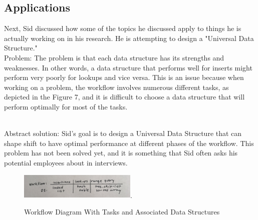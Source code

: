 \subsection{Applications}

Next, Sid discussed how some of the topics he discussed apply to things he is actually working on in his research. He is attempting to design a "Universal Data Structure."\\

\vspace{3mm}
Problem: The problem is that each data structure has its strengths and weaknesses. In other words, a data structure that performs well for inserts might perform very poorly for lookups and vice versa. This is an issue because when working on a problem, the workflow involves numerous different tasks, as depicted in the Figure 7, and it is difficult to choose a data structure that will perform optimally for most of the tasks. 

\\
\vspace{3mm}
Abstract solution: Sid's goal is to design a Universal Data Structure that can shape shift to have optimal performance at different phases of the workflow. This problem has not been solved yet, and it is something that Sid often asks his potential employees about in interviews.
\vspace{3mm}

 \begin{figure}[h!]
  \begin{center}
    \includegraphics[width=0.5\textwidth]{figures/IMG_8829.jpg}.
    \caption{
      Workflow Diagram With Tasks and Associated Data Structures}
    \label{fig:example_figure}
  \end{center}
\end{figure}


